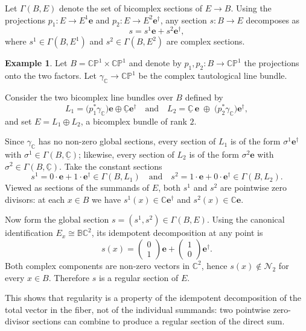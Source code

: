 \documentclass[11pt]{amsart}
\newcommand{\C}{\mathbb{C}}          %
\newcommand{\e}{\mathbf{e}}          %
\newcommand{\ed}{\mathbf{e}^\dagger} %
\theoremstyle{definition}
\newtheorem{example}[prop]{Example}       %
\begin{document}
Let $\Gamma(B,E)$ denote the set of bicomplex sections of $E \to B$. Using the projections $p_1:E \to E^1\e$ and $p_2:E \to E^2\ed$, any section $s:B \to E$ decomposes as
\begin{equation*}
    s = s^1 \e + s^2 \ed,
\end{equation*}
where $s^1 \in \Gamma(B,E^1)$ and $s^2 \in \Gamma(B,E^2)$ are complex sections.

\begin{example}\label{ex:regular_from_zero_divisors}
Let $B=\mathbb{C}\mathbb{P}^{1}\times\mathbb{C}\mathbb{P}^{1}$ and denote by 
$p_{1},p_{2}\colon B\to\mathbb{C}\mathbb{P}^{1}$ the projections onto the two factors. 
Let $\gamma_{\mathbb{C}}\to\mathbb{C}\mathbb{P}^{1}$ be the complex tautological line bundle.

Consider the two bicomplex line bundles over $B$ defined by
\begin{equation*}
L_{1}=\bigl(p_{1}^{*}\gamma_{\C}\bigr)\e\oplus\underline{\C}\ed
\quad\text{and}\quad
L_{2}=\underline{\mathbb{C}}\,\mathbf{e}\;\oplus\;\bigl(p_{2}^{*}\gamma_{\mathbb{C}}\bigr)\mathbf{e}^{\dagger},
\end{equation*}
and set $E=L_{1}\oplus L_{2}$, a bicomplex bundle of rank $2$.

Since $\gamma_{\mathbb{C}}$ has no non-zero global sections, every section of $L_{1}$ is of the form 
$\sigma^{1}\mathbf{e}^{\dagger}$ with $\sigma^{1}\in\Gamma(B,\underline{\mathbb{C}})$; likewise, every section of $L_{2}$ is of the form 
$\sigma^{2}\mathbf{e}$ with $\sigma^{2}\in\Gamma(B,\underline{\mathbb{C}})$. 
Take the constant sections
\begin{equation*}
s^{1}=0\cdot\e+1\cdot\ed\in\Gamma(B,L_{1})\quad\text{and}\quad
s^{2}=1\cdot\e+0\cdot\ed\in\Gamma(B,L_{2}).
\end{equation*}
Viewed as sections of the summands of $E$, both $s^{1}$ and $s^{2}$ are pointwise zero divisors: 
at each $x\in B$ we have $s^{1}(x)\in\mathbb{C}\mathbf{e}^{\dagger}$ and $s^{2}(x)\in\mathbb{C}\mathbf{e}$.

Now form the global section $s=(s^{1},s^{2})\in\Gamma(B,E)$. 
Using the canonical identification $E_{x}\cong\mathbb{B}\mathbb{C}^{2}$, its idempotent decomposition at any point is
\begin{equation*}
s(x)=\begin{pmatrix}0\\ 1\end{pmatrix}\mathbf{e}+\begin{pmatrix}1\\ 0\end{pmatrix}\mathbf{e}^{\dagger}.
\end{equation*}
Both complex components are non-zero vectors in $\mathbb{C}^{2}$, hence $s(x)\notin\mathcal{N}_{2}$ for every $x\in B$. Therefore $s$ is a regular section of $E$.

This shows that regularity is a property of the idempotent decomposition of the total vector in the fiber, not of the individual summands: two pointwise zero-divisor sections can combine to produce a regular section     of the direct sum.
\end{example}
\end{document}
